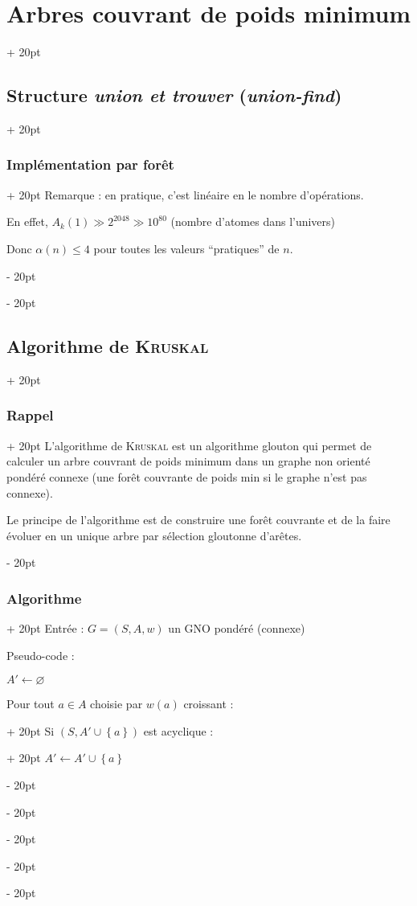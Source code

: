 \documentclass[a4paper, 12pt, twoside]{article}
\newcommand{\set}[1]{\left\{ #1 \right\}}
\renewcommand{\le}{\leqslant}
\newcommand{\ind}[1][20pt]{\advance\leftskip + #1}
\newcommand{\deind}[1][20pt]{\advance\leftskip - #1}
\newenvironment{indt}[2][20pt]{#2 \par \ind[#1]}{\par \deind} %
\begin{document}
\begin{indt}{\section{Arbres couvrant de poids minimum}}
\begin{indt}{\subsection{Structure \textit{union et trouver} (\textit{union-find})}}
\begin{indt}{\subsubsection{Implémentation par forêt}}
                Remarque : en pratique, c'est linéaire en le nombre d'opérations.

                En effet, $A_k(1) \gg 2^{2048} \gg 10^{80}$ (nombre d'atomes dans l'univers)

                Donc $\alpha(n) \le 4$ pour toutes les valeurs ``pratiques'' de $n$.
            \end{indt}
        \end{indt}

        \vspace{12pt}
        
        \begin{indt}{\subsection{Algorithme de \textsc{Kruskal}}}
            \begin{indt}{\subsubsection{Rappel}}
                L'algorithme de \textsc{Kruskal} est un algorithme glouton qui permet de calculer un arbre couvrant de poids minimum dans un graphe non orienté pondéré connexe (une forêt couvrante de poids min si le graphe n'est pas connexe).

                Le principe de l'algorithme est de construire une forêt couvrante et de la faire évoluer en un unique arbre par sélection gloutonne d'arêtes.
            \end{indt}

            \vspace{12pt}
            
            \begin{indt}{\subsubsection{Algorithme}}
                Entrée : $G = (S, A, w)$ un GNO pondéré (connexe)

                Pseudo-code :
                \begin{pseudocode}
                    $A' \leftarrow \varnothing$

                    \begin{indt}{Pour tout $a \in A$ choisie par $w(a)$ croissant :}
                        \begin{indt}{Si $(S, A' \cup \set a)$ est acyclique :}
                            $A' \leftarrow A' \cup \set a$
                        \end{indt}
                    \end{indt}


\end{pseudocode}
\end{indt}
\end{indt}
\end{indt}
\end{document}
